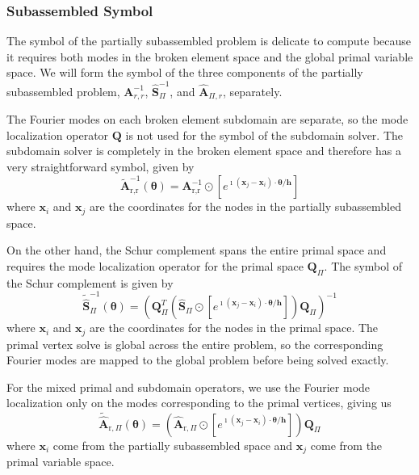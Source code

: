 \documentclass[review]{siamart190516}
\begin{document}
\subsubsection{Subassembled Symbol}\label{sec:lfasubassembled}

The symbol of the partially subassembled problem is delicate to compute because it requires both modes in the broken element space and the global primal variable space.
We will form the symbol of the three components of the partially subassembled problem, $\mathbf{A}_{r, r}^{-1}$, $\hat{\mathbf{S}}_{\Pi}^{-1}$, and $\hat{\mathbf{A}}_{\Pi, r}$, separately.

The Fourier modes on each broken element subdomain are separate, so the mode localization operator $\mathbf{Q}$ is not used for the symbol of the subdomain solver.
The subdomain solver is completely in the broken element space and therefore has a very straightforward symbol, given by
\begin{equation}
\tilde{\mathbf{A}}_{\text{r}, \text{r}}^{-1} \left( \boldsymbol{\theta} \right) = \mathbf{A}_{\text{r}, \text{r}}^{-1} \odot \left[ e^{\imath \left( \mathbf{x}_j - \mathbf{x}_i \right) \cdot \boldsymbol{\theta} / \mathbf{h}} \right]
\end{equation}
where $\mathbf{x}_i$ and $\mathbf{x}_j$ are the coordinates for the nodes in the partially subassembled space.

On the other hand, the Schur complement spans the entire primal space and requires the mode localization operator for the primal space $\mathbf{Q}_{\Pi}$.
The symbol of the Schur complement is given by
\begin{equation}
\tilde{\hat{\mathbf{S}}}_{\Pi}^{-1} \left( \boldsymbol{\theta} \right) = \left( \mathbf{Q}_{\Pi}^T \left( \hat{\mathbf{S}}_{\Pi} \odot \left[ e^{\imath \left( \mathbf{x}_j - \mathbf{x}_i \right) \cdot \boldsymbol{\theta} / \mathbf{h}} \right] \right) \mathbf{Q}_{\Pi} \right)^{-1}
\end{equation}
where $\mathbf{x}_i$ and $\mathbf{x}_j$ are the coordinates for the nodes in the primal space.
The primal vertex solve is global across the entire problem, so the corresponding Fourier modes are mapped to the global problem before being solved exactly.

For the mixed primal and subdomain operators, we use the Fourier mode localization only on the modes corresponding to the primal vertices, giving us
\begin{equation}
\tilde{\hat{\mathbf{A}}}_{\text{r}, \Pi} \left( \boldsymbol{\theta} \right) = \left( \hat{\mathbf{A}}_{\text{r}, \Pi} \odot \left[ e^{\imath \left( \mathbf{x}_j - \mathbf{x}_i \right) \cdot \boldsymbol{\theta} / \mathbf{h}} \right] \right) \mathbf{Q}_{\Pi}
\end{equation}
where $\mathbf{x}_i$ come from the partially subassembled space and $\mathbf{x}_j$ come from the primal variable space.
\end{document}
